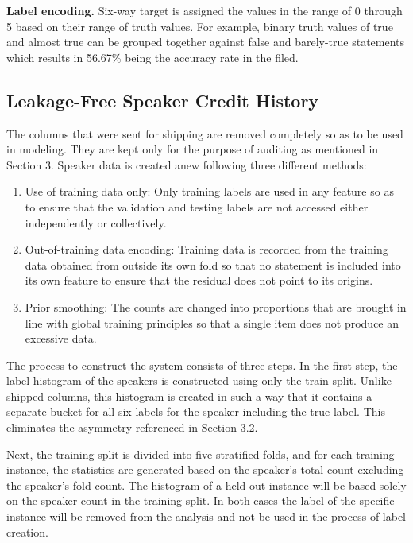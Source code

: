 \textbf{Label encoding.} Six-way target is assigned the values in the range of 0 through 5 based on their range of truth values. For example, binary truth values of true and almost true can be grouped together against false and barely-true statements which results in 56.67\% being the accuracy rate in the filed.

\subsection{Leakage-Free Speaker Credit History}

The columns that were sent for shipping are removed completely so as to be used in modeling. They are kept only for the purpose of auditing as mentioned in Section 3. Speaker data is created anew following three different methods:

\begin{enumerate}
\item Use of training data only: Only training labels are used in any feature so as to ensure that the validation and testing labels are not accessed either independently or collectively.
\item Out-of-training data encoding: Training data is recorded from the training data obtained from outside its own fold so that no statement is included into its own feature to ensure that the residual does not point to its origins.
\item Prior smoothing: The counts are changed into proportions that are brought in line with global training principles so that a single item does not produce an excessive data.
\end{enumerate}

The process to construct the system consists of three steps. In the first step, the label histogram of the speakers is constructed using only the train split. Unlike shipped columns, this histogram is created in such a way that it contains a separate bucket for all six labels for the speaker including the true label. This eliminates the asymmetry referenced in Section 3.2.

Next, the training split is divided into five stratified folds, and for each training instance, the statistics are generated based on the speaker's total count excluding the speaker's fold count. The histogram of a held-out instance will be based solely on the speaker count in the training split. In both cases the label of the specific instance will be removed from the analysis and not be used in the process of label creation.

